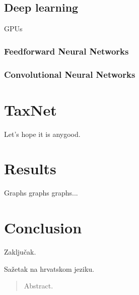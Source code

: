 \documentclass[times, utf8, diplomski]{fer}
\begin{document}
\section{Deep learning}
GPUs

\subsection{Feedforward Neural Networks}
\subsection{Convolutional Neural Networks}


\chapter{TaxNet}
Let's hope it is anygood.

\chapter{Results}
Graphs graphs graphs...

\chapter{Conclusion}
Zaključak.





\begin{sazetak}
Sažetak na hrvatskom jeziku.

\end{sazetak}

\begin{abstract}
Abstract.

\end{abstract}
\end{document}
